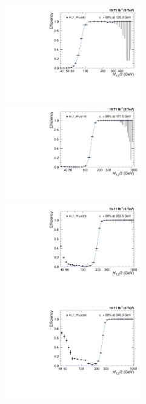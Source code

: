 \begin{figure}[!htbp]
 \begin{center}
 \hspace*{-10mm}\includegraphics[width=0.53\textwidth]{Plots_HT_2_150/Fit_Turn_Efficiency_80_2_ht_2.pdf}%
 ~~\includegraphics[width=0.53\textwidth]{Plots_HT_2_150/Fit_Turn_Efficiency_140_2_ht_2.pdf}\\
 \hspace*{-10mm}\includegraphics[width=0.53\textwidth]{Plots_HT_2_150/Fit_Turn_Efficiency_200_2_ht_2.pdf}%
 ~~\includegraphics[width=0.53\textwidth]{Plots_HT_2_150/Fit_Turn_Efficiency_260_2_ht_2.pdf}\\

\end{center}
\end{figure}
